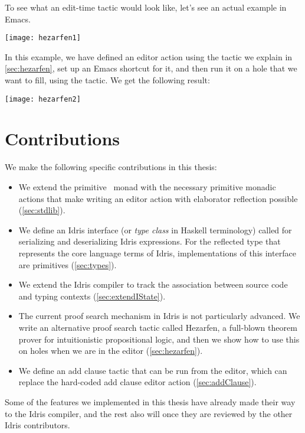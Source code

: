 To see what an edit-time tactic would look like, let's see an actual example in Emacs.

\vspace{1em}
\texttt{[image: hezarfen1]}

In this example, we have defined an editor action  using the tactic
we explain in \autoref{sec:hezarfen}, set up an Emacs shortcut for it, and then
run it on a hole that we want to fill, using the tactic. We get the following
result:

\vspace{1em}
\texttt{[image: hezarfen2]}

\section{Contributions}

We make the following specific
contributions in this thesis:
\begin{itemize}
\item We extend the primitive \Elab\ monad with the necessary primitive monadic
actions that make writing an editor action with elaborator reflection possible
(\autoref{sec:stdlib}).
\item We define an Idris interface (or \emph{type class} in Haskell terminology)
called  for serializing and deserializing Idris expressions.
For the reflected type that represents the core language terms of Idris,
implementations of this interface are primitives (\autoref{sec:types}).
\item We extend the Idris compiler to track the association between source code
  and typing contexts (\autoref{sec:extendIState}).
\item The current proof search mechanism in Idris is not particularly advanced.
We write an alternative proof search tactic called Hezarfen, a full-blown
theorem prover for intuitionistic propositional logic, and then we show how
to use this on holes when we are in the editor (\autoref{sec:hezarfen}).
\item We define an add clause tactic that can be run from the editor, which can
replace the hard-coded add clause editor action (\autoref{sec:addClause}).
\end{itemize}

Some of the features we implemented in this thesis have already made their way to
the Idris compiler, and the rest also will once they are reviewed by the
other Idris contributors.


